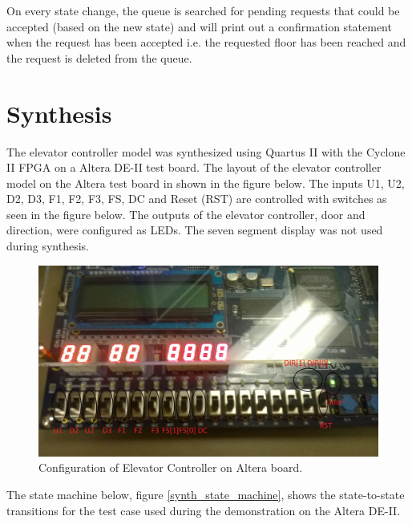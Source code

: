 \documentclass[journal]{IEEEtran}
\begin{document}
On every state change, the queue is searched for pending requests that could be accepted (based on the new state) and will print out a confirmation statement when the request has been accepted i.e. the requested floor has been reached and the request is deleted from the queue.

\section{Synthesis}
The elevator controller model was synthesized using Quartus II with the Cyclone II FPGA  on a Altera DE-II test board. The layout of the elevator controller model on the Altera test board in shown in the figure below. The inputs U1, U2, D2, D3, F1, F2, F3, FS, DC and Reset (RST) are controlled with switches as seen in the figure below. The outputs of the elevator controller, door and direction, were configured as LEDs. The seven segment display was not used during synthesis. 

\begin{figure}[h]
\centering
\includegraphics[width=0.9\linewidth]{Altera_Config.jpg}
\caption{Configuration of Elevator Controller on Altera board.}
\label{altera_configuration}
\end{figure}

The state machine below, figure \ref{synth_state_machine}, shows the state-to-state transitions for the test case used during the demonstration on the Altera DE-II. 
\end{document}
